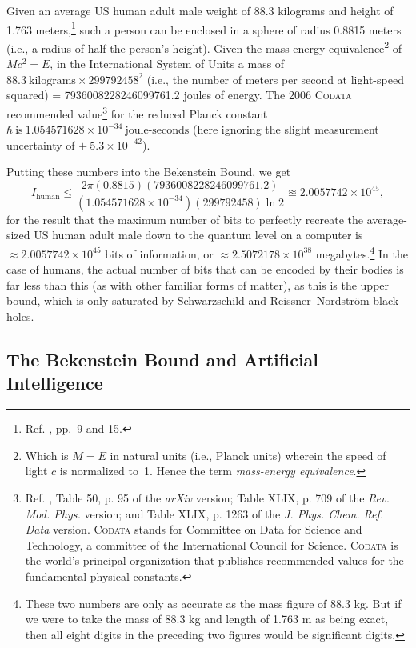 \documentclass[letterpaper,12pt]{article}
\begin{document}
Given an average US human adult male weight of 88.3 kilograms and height of 1.763 meters,\footnote{Ref. , pp.~9 and 15.} such a person can be enclosed in a sphere of radius 0.8815 meters (i.e., a radius of half the person's height). Given the mass-energy equivalence\footnote{Which is \( M = E \) in natural units (i.e., Planck units) wherein the speed of light \( c \) is normalized to~1. Hence the term \emph{mass-energy equivalence}.} of \( M c^2 = E \), in the International System of Units a mass of \( 88.3\ \text{kilograms} \times 299792458^2 \) (i.e., the number of meters per second at light-speed squared) = 7936008228246099761.2 joules of energy. The 2006 \textsc{Codata} recommended value\footnote{Ref. , Table 50, p. 95 of the \emph{arXiv} version; Table XLIX, p. 709 of the \emph{Rev. Mod. Phys.} version; and Table XLIX, p. 1263 of the \emph{J. Phys. Chem. Ref. Data} version. \textsc{Codata} stands for Committee on Data for Science and Technology, a committee of the International Council for Science. \textsc{Codata} is the world's principal organization that publishes recommended values for the fundamental physical constants.} for the reduced Planck constant \( \hbar\ \text{is}\ 1.054571628\times 10^{-34}\ \text{joule-seconds} \) (here ignoring the slight measurement uncertainty of \( \pm\ 5.3\times 10^{-42} \)).

Putting these numbers into the Bekenstein Bound, we get \begin{equation}
I_{\text{human}} \leq \frac{2 \pi (0.8815) (7936008228246099761.2)}{(1.054571628\times 10^{-34}) (299792458) \ln 2 } \approxeq 2.0057742\times 10^{45},
\label{eq:BekensteinBoundHuman}
\end{equation} for the result that the maximum number of bits to perfectly recreate the average-sized US human adult male down to the quantum level on a computer is \( \approx 2.0057742\times 10^{45} \) bits of information, or \( \approx 2.5072178\times 10^{38} \) megabytes.\footnote{These two numbers are only as accurate as the mass figure of 88.3 kg. But if we were to take the mass of 88.3 kg and length of 1.763 m as being exact, then all eight digits in the preceding two figures would be significant digits.} In the case of humans, the actual number of bits that can be encoded by their bodies is far less than this (as with other familiar forms of matter), as this is the upper bound, which is only saturated by Schwarzschild and Reissner--Nordstr\"{o}m black holes.

\subsection{The Bekenstein Bound and Artificial Intelligence}
\label{subsec:BekensteinBoundAI}
\end{document}
